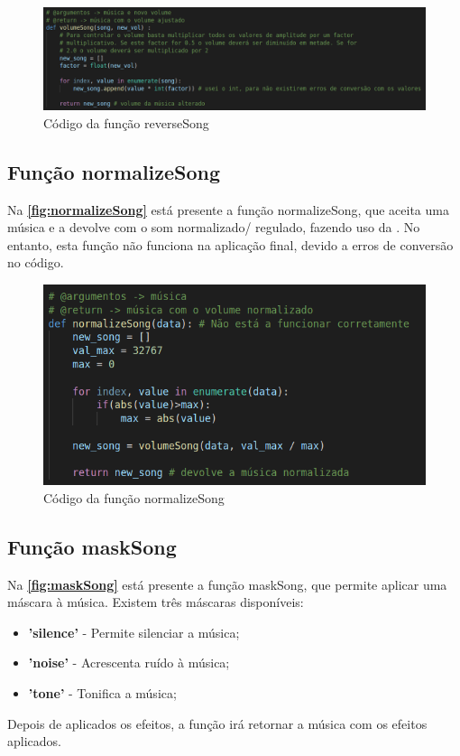 \documentclass{report}
\begin{document}
\begin{figure}[!h]
\center 
\includegraphics[width=330pt]{img/volumeSong.png}
\caption{Código da função reverseSong}
\label{fig:volumeSong}
\end{figure}

\subsection{Função normalizeSong}
\label{ssec:normalizeSong}
Na \textbf{\autoref{fig:normalizeSong}} está presente a função normalizeSong, que aceita uma música e a devolve com o som 
normalizado/ regulado, fazendo uso da . No entanto, esta função não funciona na aplicação final, 
devido a erros de conversão no código.

\begin{figure}[!h]
\center 
\includegraphics[width=330pt]{img/normalizeSong.png}
\caption{Código da função normalizeSong}
\label{fig:normalizeSong}
\end{figure}

\subsection{Função maskSong}
\label{ssec:maskSong}
Na \textbf{\autoref{fig:maskSong}} está presente a função maskSong, que permite aplicar uma máscara à música. Existem três
máscaras disponíveis:
\begin{itemize}
    \item \textbf{'silence'} - Permite silenciar a música;
    \item \textbf{'noise'} - Acrescenta ruído à música;
    \item \textbf{'tone'} - Tonifica a música;
\end{itemize}
Depois de aplicados os efeitos, a função irá retornar a música com os efeitos aplicados.
\end{document}
